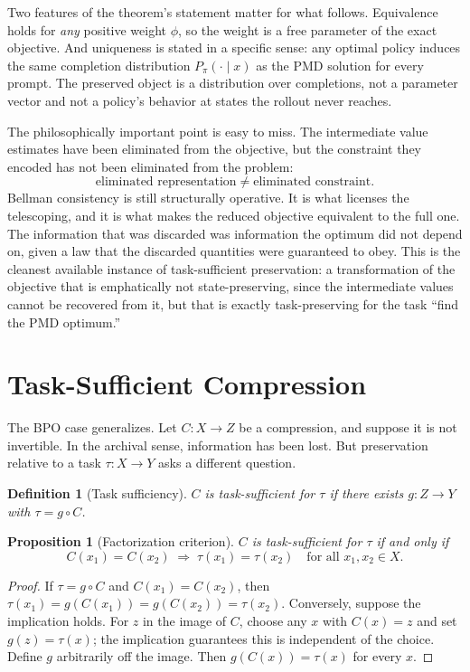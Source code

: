 \documentclass[11pt]{article}
\newtheorem{definition}{Definition}
\newtheorem{proposition}{Proposition}
\theoremstyle{remark}
\begin{document}
Two features of the theorem's statement matter for what follows. Equivalence holds for \emph{any} positive weight $\phi$, so the weight is a free parameter of the exact objective. And uniqueness is stated in a specific sense: any optimal policy induces the same completion distribution $P_{\pi}(\cdot\mid x)$ as the PMD solution for every prompt. The preserved object is a distribution over completions, not a parameter vector and not a policy's behavior at states the rollout never reaches.

The philosophically important point is easy to miss. The intermediate value estimates have been eliminated from the objective, but the constraint they encoded has not been eliminated from the problem:
\[
\text{eliminated representation} \neq \text{eliminated constraint}.
\]
Bellman consistency is still structurally operative. It is what licenses the telescoping, and it is what makes the reduced objective equivalent to the full one. The information that was discarded was information the optimum did not depend on, given a law that the discarded quantities were guaranteed to obey. This is the cleanest available instance of task-sufficient preservation: a transformation of the objective that is emphatically not state-preserving, since the intermediate values cannot be recovered from it, but that is exactly task-preserving for the task ``find the PMD optimum.''

\section{Task-Sufficient Compression}

The BPO case generalizes. Let $C:X\to Z$ be a compression, and suppose it is not invertible. In the archival sense, information has been lost. But preservation relative to a task $\tau:X\to Y$ asks a different question.

\begin{definition}[Task sufficiency]
$C$ is \emph{task-sufficient} for $\tau$ if there exists $g:Z\to Y$ with $\tau = g\circ C$.
\end{definition}

\begin{proposition}[Factorization criterion]\label{prop:factor}
$C$ is task-sufficient for $\tau$ if and only if
\[
C(x_1)=C(x_2)\;\Rightarrow\;\tau(x_1)=\tau(x_2)\quad\text{for all }x_1,x_2\in X.
\]
\end{proposition}

\begin{proof}
If $\tau=g\circ C$ and $C(x_1)=C(x_2)$, then $\tau(x_1)=g(C(x_1))=g(C(x_2))=\tau(x_2)$. Conversely, suppose the implication holds. For $z$ in the image of $C$, choose any $x$ with $C(x)=z$ and set $g(z)=\tau(x)$; the implication guarantees this is independent of the choice. Define $g$ arbitrarily off the image. Then $g(C(x))=\tau(x)$ for every $x$.
\end{proof}
\end{document}
